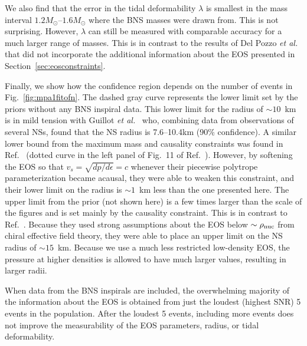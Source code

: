 \documentclass[twocolumn,prd,amssymb,aps,nofootinbib,showpacs,epsf]{revtex4}
\begin{document}
We also find that the error in the tidal deformability $\lambda$ is smallest in the mass interval $1.2M_\odot$--$1.6M_\odot$ where the BNS masses were drawn from. This is not surprising. However, $\lambda$ can still be measured with comparable accuracy for a much larger range of masses. This is in contrast to the results of Del Pozzo {\it et al.}~\cite{DelPozzoLiAgathos2013} that did not incorporate the additional information about the EOS presented in Section~\ref{sec:eosconstraints}.

Finally, we show how the confidence region depends on the number of events in Fig.~\ref{fig:mpa1fitofn}. The dashed gray curve represents the lower limit set by the priors without any BNS inspiral data. This lower limit for the radius of $\sim 10$~km is in mild tension with Guillot {\it et al.}~\cite{GuillotServillatWebb2013} who, combining data from observations of several NSs, found that the NS radius is 7.6--10.4km (90\% confidence). A similar lower bound from the maximum mass and causality constraints was found in Ref.~\cite{HebelerLattimerPethick2013} (dotted curve in the left panel of Fig.~11 of Ref.~\cite{HebelerLattimerPethick2013}). However, by softening the EOS so that $v_s = \sqrt{dp/d\epsilon} = c$ whenever their piecewise polytrope parameterization became acausal, they were able to weaken this constraint, and their lower limit on the radius is $\sim 1$~km less than the one presented here. The upper limit from the prior (not shown here) is a few times larger than the scale of the figures and is set mainly by the causality constraint. This is in contrast to Ref.~\cite{HebelerLattimerPethick2013}. Because they used strong assumptions about the EOS below $\sim \rho_{\rm nuc}$ from chiral effective field theory, they were able to place an upper limit on the NS radius of $\sim 15$~km. Because we use a much less restricted low-density EOS, the pressure at higher densities is allowed to have much larger values, resulting in larger radii.

When data from the BNS inspirals are included, the overwhelming majority of the information about the EOS is obtained from just the loudest (highest SNR) 5 events in the population. After the loudest 5 events, including more events does not improve the measurability of the EOS parameters, radius, or tidal deformability.
\end{document}
